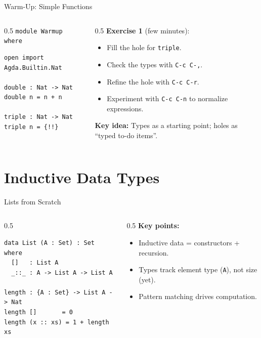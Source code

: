\documentclass[aspectratio=169]{beamer}
\begin{document}
\begin{frame}[fragile]{Warm-Up: Simple Functions}
  \begin{columns}
    \begin{column}{0.5\textwidth}
      \lstinline!module Warmup where!

\begin{lstlisting}
open import Agda.Builtin.Nat

double : Nat -> Nat
double n = n + n

triple : Nat -> Nat
triple n = {!!}
\end{lstlisting}
    \end{column}
    \begin{column}{0.5\textwidth}
      \textbf{Exercise 1} (few minutes):
      \begin{itemize}
        \item Fill the hole for \texttt{triple}.
        \item Check the types with \texttt{C-c C-,}.
        \item Refine the hole with \texttt{C-c C-r}.
        \item Experiment with \texttt{C-c C-n} to normalize expressions.
      \end{itemize}
      \vspace{1em}
      \textbf{Key idea:} Types as a starting point; holes as “typed to-do items”.
    \end{column}
  \end{columns}
\end{frame}

\section{Inductive Data Types}

\begin{frame}[fragile]{Lists from Scratch}
  \begin{columns}
    \begin{column}{0.5\textwidth}
\begin{lstlisting}
data List (A : Set) : Set where
  []   : List A
  _::_ : A -> List A -> List A

length : {A : Set} -> List A -> Nat
length []       = 0
length (x :: xs) = 1 + length xs
\end{lstlisting}
    \end{column}
    \begin{column}{0.5\textwidth}
      \textbf{Key points:}
      \begin{itemize}
        \item Inductive data = constructors + recursion.
        \item Types track element type (\texttt{A}), not size (yet).
        \item Pattern matching drives computation.
      \end{itemize}
    \end{column}
  \end{columns}
\end{frame}
\end{document}
